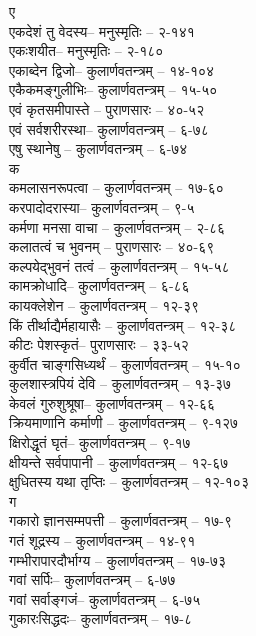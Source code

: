 \begin{raggedright}
\begin{parcolumns}[colwidths={1=.55\textwidth,2=.55\textwidth}]{2}
{{\large ए}\\
एकदेशं तु वेदस्य– 	मनुस्मृतिः  – २-१४१\\
एकःशयीत– 	मनुस्मृतिः  – २-१८०\\
एकाब्देन द्विजो– 	कुलार्णवतन्त्रम्  – १४-१०४\\
एकैकमङ्गुलीभिः– 	कुलार्णवतन्त्रम्  – १५-५०\\
एवं कृतसमीपास्ते	– 	पुराणसारः   – ४०-५२	\\
एवं सर्वशरीरस्था– 	कुलार्णवतन्त्रम्  – ६-७८\\
एषु स्थानेषु	– 	कुलार्णवतन्त्रम्  – ६-७४\\
{\large क}\\
कमलासनरूपत्वा	– 	कुलार्णवतन्त्रम्  – १७-६०	\\
करपादोदरास्या– 	कुलार्णवतन्त्रम्  – ९-५\\
कर्मणा मनसा वाचा	– 	कुलार्णवतन्त्रम्  – २-८६\\
कलातत्वं च भुवनम्	– 	पुराणसारः   – ४०-६९	\\
कल्पयेद्भुवनं तत्वं	– 	कुलार्णवतन्त्रम्  – १५-५८\\
कामक्रोधादि– 	कुलार्णवतन्त्रम्  – ६-८६\\
कायक्लेशेन	– 	कुलार्णवतन्त्रम्  – १२-३९\\
किं तीर्थाद्यैर्महायासैः	– 	कुलार्णवतन्त्रम्  – १२-३८\\
कीटः पेशस्कृतं–   पुराणसारः   – ३३-५२\\
कुर्वीत चाङ्गसिध्यर्थं	– 	कुलार्णवतन्त्रम्  – १५-१०\\
कुलशास्त्रपियं देवि	– 	कुलार्णवतन्त्रम्  – १३-३७\\
केवलं गुरुशुश्रूषा– 	कुलार्णवतन्त्रम्  – १२-६६\\
क्रियमाणानि कर्माणी	– 	कुलार्णवतन्त्रम्  – ९-१२७\\
क्षिरोद्धृतं घृतं– 	कुलार्णवतन्त्रम्  – ९-१७\\
क्षीयन्ते सर्वपापानी	– 	कुलार्णवतन्त्रम्  – १२-६७\\
क्षुधितस्य यथा तृप्तिः	– 	कुलार्णवतन्त्रम्  – १२-१०३\\
{\large ग}\\
गकारो ज्ञानसम्मपत्ती	– 	कुलार्णवतन्त्रम्  – १७-९\\
गतं शूद्रस्य	– 	कुलार्णवतन्त्रम्  – १४-९१\\
गम्भीरापारदौर्भाग्य	– 	कुलार्णवतन्त्रम्  – १७-७३	\\
गवां सर्पिः– 	कुलार्णवतन्त्रम्  – ६-७७\\
गवां सर्वाङ्गजं– 	कुलार्णवतन्त्रम्  – ६-७५\\
गुकारःसिद्धदः– 	कुलार्णवतन्त्रम्  – १७-८\\
}
\end{parcolumns}
\end{raggedright}
